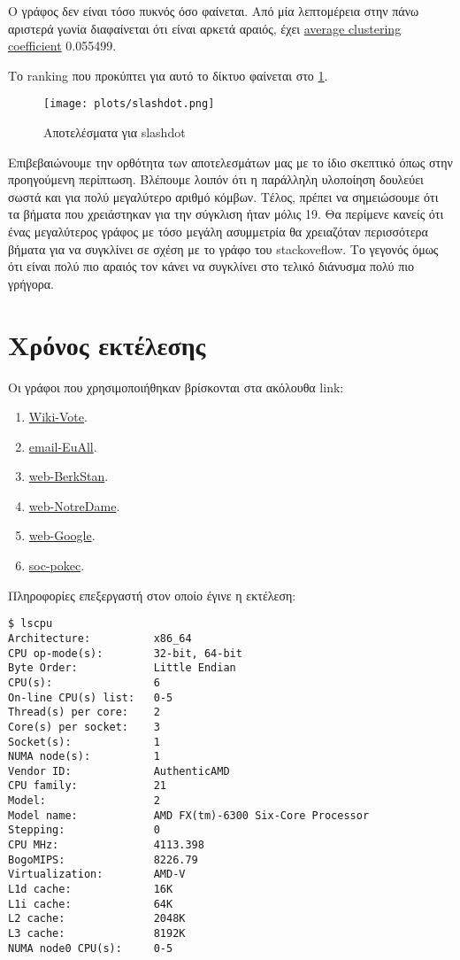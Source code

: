 Ο γράφος δεν είναι τόσο πυκνός όσο φαίνεται.
Από μία λεπτομέρεια στην πάνω αριστερά γωνία διαφαίνεται ότι είναι αρκετά αραιός,
έχει
\href{https://en.wikipedia.org/wiki/Clustering_coefficient#Global_clustering_coefficient}{average clustering coefficient} 0.055499.

Το ranking που προκύπτει για αυτό το δίκτυο φαίνεται στο
\hyperref[fig:slackres]{\figurename{} \ref{fig:slackres}}.
\begin{figure}[h!t]
	\centering
	\texttt{[image: plots/slashdot.png]}
	\caption{Αποτελέσματα για slashdot}
	\label{fig:slackres}
\end{figure}
Επιβεβαιώνουμε την ορθότητα των αποτελεσμάτων μας με το ίδιο σκεπτικό όπως στην προηγούμενη περίπτωση.
Βλέπουμε λοιπόν ότι η παράλληλη υλοποίηση δουλεύει σωστά και για πολύ μεγαλύτερο αριθμό κόμβων.
Τέλος, πρέπει να σημειώσουμε ότι τα βήματα που χρειάστηκαν για την σύγκλιση ήταν μόλις 19.
Θα περίμενε κανείς ότι ένας μεγαλύτερος γράφος με τόσο μεγάλη ασυμμετρία θα χρειαζόταν περισσότερα βήματα για να συγκλίνει σε σχέση με το γράφο του stackoveflow.
Το γεγονός όμως ότι είναι πολύ πιο αραιός τον κάνει να συγκλίνει στο τελικό διάνυσμα πολύ πιο γρήγορα.
\clearpage
\section{Χρόνος εκτέλεσης}
Οι γράφοι που χρησιμοποιήθηκαν βρίσκονται στα ακόλουθα link:
\begin{enumerate} 
	\item \href{https://snap.stanford.edu/data/wiki-Vote.html}{Wiki-Vote}.
	\item \href{https://snap.stanford.edu/data/email-EuAll.html}{email-EuAll}.
	\item \href{https://snap.stanford.edu/data/web-BerkStan.html}{web-BerkStan}.
	\item \href{https://snap.stanford.edu/data/web-NotreDame.html}{web-NotreDame}.
	\item \href{https://snap.stanford.edu/data/web-Google.html}{web-Google}.
	\item \href{https://snap.stanford.edu/data/soc-pokec.html}{soc-pokec}.
\end{enumerate}

Πληροφορίες επεξεργαστή στον οποίο έγινε η εκτέλεση:
\begin{lstlisting}[style=Bash]
$ lscpu
Architecture:          x86_64
CPU op-mode(s):        32-bit, 64-bit
Byte Order:            Little Endian
CPU(s):                6
On-line CPU(s) list:   0-5
Thread(s) per core:    2
Core(s) per socket:    3
Socket(s):             1
NUMA node(s):          1
Vendor ID:             AuthenticAMD
CPU family:            21
Model:                 2
Model name:            AMD FX(tm)-6300 Six-Core Processor
Stepping:              0
CPU MHz:               4113.398
BogoMIPS:              8226.79
Virtualization:        AMD-V
L1d cache:             16K
L1i cache:             64K
L2 cache:              2048K
L3 cache:              8192K
NUMA node0 CPU(s):     0-5
\end{lstlisting}

